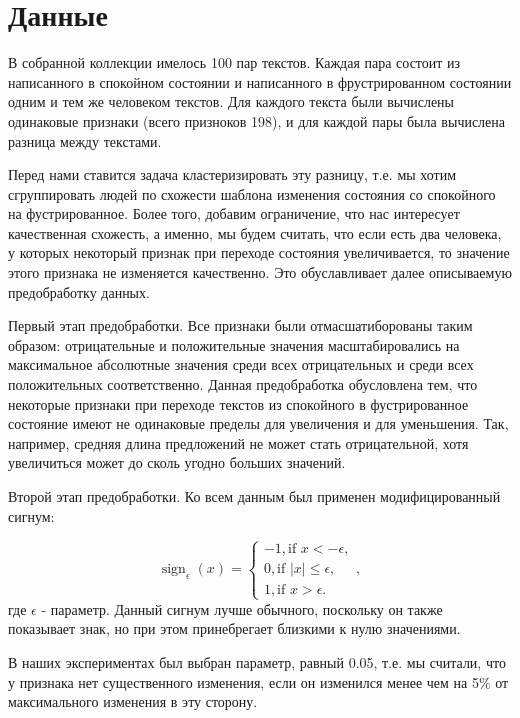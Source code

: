 \documentclass[12pt]{article}
\DeclareMathOperator{\sign}{sign}
\begin{document}
\section{Данные}

В собранной коллекции имелось 100 пар текстов. Каждая пара состоит из написанного в спокойном состоянии и написанного в фрустрированном состоянии одним и тем же человеком текстов. Для каждого текста были вычислены одинаковые признаки (всего призноков 198), и для каждой пары была вычислена разница между текстами.

Перед нами ставится задача кластеризировать эту разницу, т.е. мы хотим сгруппировать людей по схожести шаблона изменения состояния со спокойного на фустрированное. Более того, добавим ограничение, что нас интересует качественная схожесть, а именно, мы будем считать, что если есть два человека, у которых некоторый признак при переходе состояния увеличивается, то значение этого признака не изменяется качественно. Это обуславливает далее описываемую предобработку данных.

Первый этап предобработки. Все признаки были отмасшатиборованы таким образом: отрицательные и положительные значения масштабировались на максимальное абсолютные значения среди всех отрицательных и среди всех положительных соответственно. Данная предобработка обусловлена тем, что некоторые признаки при переходе текстов из спокойного в фустрированное состояние имеют не одинаковые пределы для увеличения и для уменьшения. Так, например, средняя длина предложений не может стать отрицательной, хотя увеличиться может до сколь угодно больших значений. 

Второй этап предобработки. Ко всем данным был применен модифицированный сигнум:

\begin{equation*}
\sign_\epsilon(x) = 
 \begin{cases}
   -1, \text{if } x < -\epsilon,\\
   0, \text{if } |x| \leq \epsilon,\\
   1, \text{if } x > \epsilon.
 \end{cases}
 ,
\end{equation*}
где $\epsilon$ - параметр. Данный сигнум лучше обычного, поскольку он также показывает знак, но при этом принебрегает близкими к нулю значениями.

В наших экспериментах был выбран параметр, равный 0.05, т.е. мы считали, что у признака нет существенного изменения, если он изменился менее чем на 5$\%$ от максимального изменения в эту сторону.
\end{document}
